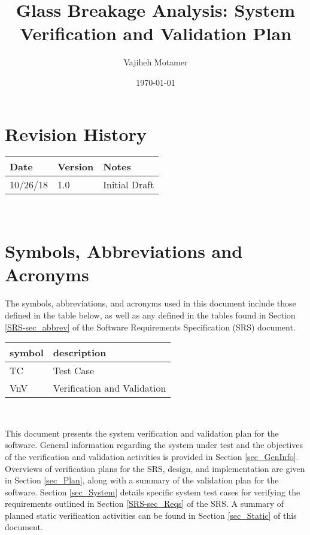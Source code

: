 \documentclass[12pt, titlepage]{article}
\begin{document}
\title{Glass Breakage Analysis: System Verification and Validation Plan
  } 
\author{Vajiheh Motamer}
\date{\today}
	
\maketitle


\section{Revision History}

\begin{tabularx}{\textwidth}{p{3cm}p{2cm}X}
\toprule {\bf Date} & {\bf Version} & {\bf Notes}\\
\midrule
10/26/18 & 1.0 & Initial Draft\\

\bottomrule
\end{tabularx}

~\newpage

\section{Symbols, Abbreviations and Acronyms}
The symbols, abbreviations, and acronyms used in this document include those 
defined in the table below, as well as any defined in the tables found in 
Section \ref{SRS-sec_abbrev} of the Software Requirements Specification (SRS) 
document.
\newline

\renewcommand{\arraystretch}{1.2}
\begin{tabular}{l l} 
  \toprule		
  \textbf{symbol} & \textbf{description}\\
  \midrule 
    TC & Test Case\\
  VnV & Verification and Validation\\
  \bottomrule
\end{tabular}\\

\newpage

\tableofcontents

\listoftables

\newpage


\noindent This document presents the system verification and validation plan 
for the software. General information regarding the system under test and the 
objectives of the verification and validation activities is provided in Section 
\ref{sec_GenInfo}. Overviews of verification plans for the SRS, design, and 
implementation are given in Section \ref{sec_Plan}, along with a summary of the 
validation plan for the software. Section \ref{sec_System} details specific  
system test cases for verifying the requirements outlined in Section 
\ref{SRS-sec_Reqs} of the SRS. A summary of planned static verification 
activities can be found in Section \ref{sec_Static} of this document.
\end{document}
